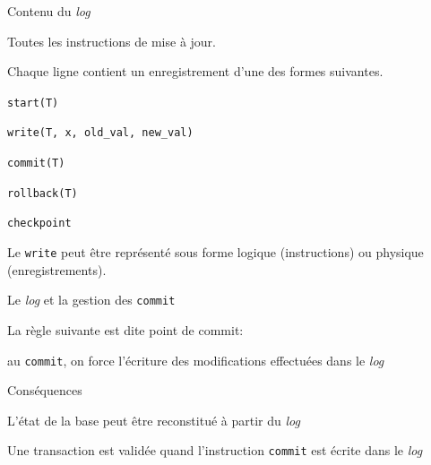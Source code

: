 \documentclass[aspectratio=169, handout]{beamer} %
\begin{document}
 
 
\begin{frame}{Contenu du \textit{log}}

Toutes les instructions de mise à jour.

\vfill

Chaque ligne contient un enregistrement d'une des formes suivantes.

\begin{redbullet}
  \item \texttt{start(T)}
  \item \texttt{write(T, x, old\_val, new\_val)}
  \item \texttt{commit(T)}
  \item \texttt{rollback(T)}
  \item \texttt{checkpoint}
\end{redbullet}

\vfill

\begin{blocgauche}
Le \texttt{write} peut être
représenté sous forme \alert{logique}
(instructions) ou \alert{physique}
(enregistrements).
\end{blocgauche}
\end{frame}

 
\begin{frame}{Le \textit{log} et la gestion des \texttt{commit}}

La règle suivante est dite \alert{point de commit}:

\vfill

\begin{redbullet}

  \item au \texttt{commit}, on force l'écriture des modifications effectuées
  dans le \textit{log}
\end{redbullet}

\vfill
Conséquences
\vfill

\begin{blocgauche}
\begin{redbullet}
  \item \alert{L'état de la base} peut être reconstitué à partir du \textit{log}
\item Une transaction est validée  quand l'instruction \texttt{commit}  est écrite dans le \textit{log}
\end{redbullet}
\end{blocgauche}

\end{frame}
 
\end{document}
